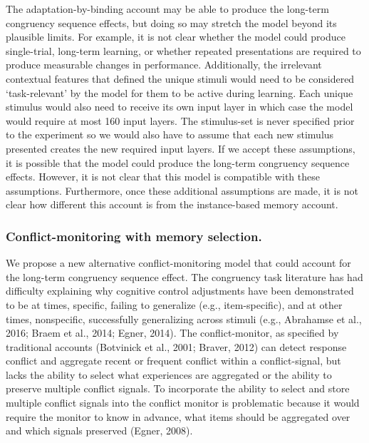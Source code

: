 \documentclass[]{DissertateCUNY}
\begin{document}
The adaptation-by-binding account may be able to produce the long-term
congruency sequence effects, but doing so may stretch the model beyond
its plausible limits. For example, it is not clear whether the model
could produce single-trial, long-term learning, or whether repeated
presentations are required to produce measurable changes in performance.
Additionally, the irrelevant contextual features that defined the unique
stimuli would need to be considered `task-relevant' by the model for
them to be active during learning. Each unique stimulus would also need
to receive its own input layer in which case the model would require at
most 160 input layers. The stimulus-set is never specified prior to the
experiment so we would also have to assume that each new stimulus
presented creates the new required input layers. If we accept these
assumptions, it is possible that the model could produce the long-term
congruency sequence effects. However, it is not clear that this model is
compatible with these assumptions. Furthermore, once these additional
assumptions are made, it is not clear how different this account is from
the instance-based memory account.

\hypertarget{conflict-monitoring-with-memory-selection.}{%
\subsubsection{Conflict-monitoring with memory
selection.}\label{conflict-monitoring-with-memory-selection.}}

We propose a new alternative conflict-monitoring model that could
account for the long-term congruency sequence effect. The congruency
task literature has had difficulty explaining why cognitive control
adjustments have been demonstrated to be at times, specific, failing to
generalize (e.g., item-specific), and at other times, nonspecific,
successfully generalizing across stimuli (e.g., Abrahamse et al., 2016;
Braem et al., 2014; Egner, 2014). The conflict-monitor, as specified by
traditional accounts (Botvinick et al., 2001; Braver, 2012) can detect
response conflict and aggregate recent or frequent conflict within a
conflict-signal, but lacks the ability to select what experiences are
aggregated or the ability to preserve multiple conflict signals. To
incorporate the ability to select and store multiple conflict signals
into the conflict monitor is problematic because it would require the
monitor to know in advance, what items should be aggregated over and
which signals preserved (Egner, 2008).
\end{document}
